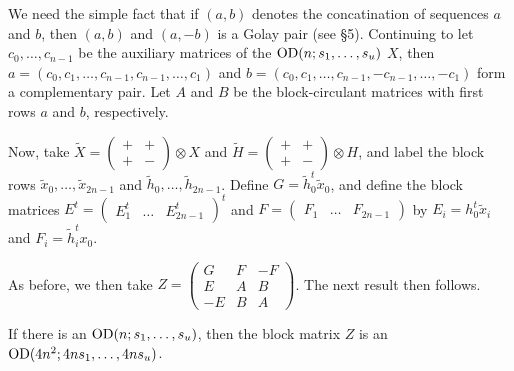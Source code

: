 \documentclass[../../../main]{subfiles}
\begin{document}
 We need the simple fact that if $(a,b)$ denotes the concatination of sequences $a$ and $b$, then $(a,b)$ and $(a,-b)$ is a Golay pair (see \S5). Continuing to let $c_0, \dots, c_{n-1}$ be the auxiliary matrices of the $\text{OD}(n; s_1, \dots, s_u)$ $X$, then $a=(c_0,c_1, \dots, c_{n-1},c_{n-1},\dots,c_1)$ and $b=(c_0,c_1, \dots, c_{n-1},-c_{n-1},\dots,-c_1)$ form a complementary pair. Let $A$ and $B$ be the block-circulant matrices with first rows $a$ and $b$, respectively. 
 
 Now, take $\tilde X = \left(\begin{smallmatrix} +&+\\+&- \end{smallmatrix}\right) \otimes X$ and $\tilde H = \left(\begin{smallmatrix} +&+\\+&- \end{smallmatrix}\right) \otimes H$, and label the block rows $\tilde x_0, \dots, \tilde x_{2n-1}$ and $\tilde h_0, \dots, \tilde h_{2n-1}$. Define $G=\tilde h_0^t \tilde x_0$, and define the block matrices $E^t=(\begin{smallmatrix} E_1^t & \dots & E_{2n-1}^t \end{smallmatrix})^t$ and $F=(\begin{smallmatrix} F_1 & \dots & F_{2n-1} \end{smallmatrix})$ by $E_i=h_0^t\tilde x_i$ and $F_i=\tilde h_i^t x_0$.
 
 As before, we then take $Z=\left(\begin{smallmatrix} G&F&-F\\E&A&B\\-E&B&A \end{smallmatrix}\right)$. The next result then follows.
 
 \begin{thm}\label{stable-od-thm}
  If there is an $\text{OD}(n;s_1, \dots, s_u)$, then the block matrix $Z$ is an $\text{OD}(4n^2; 4ns_1, \dots, 4ns_u)$. 
 \end{thm}
 
\end{document}
